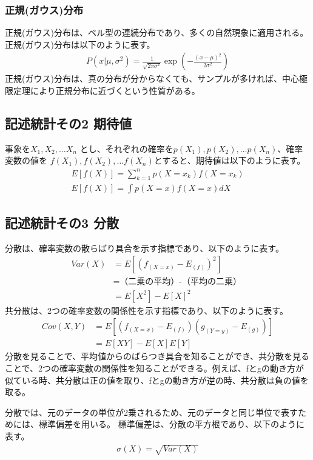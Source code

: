 \documentclass{ltjsarticle}
\begin{document}
\par
\subsubsection*{正規(ガウス)分布}
正規(ガウス)分布は、ベル型の連続分布であり、多くの自然現象に適用される。
正規(ガウス)分布は以下のように表す。
\begin{align}
P(x|\mu, \sigma^2) = \frac{1}{\sqrt{2\pi\sigma^2}} \exp \left( -\frac{(x-\mu)^2}{2\sigma^2} \right)
\end{align}
正規(ガウス)分布は、真の分布が分からなくても、サンプルが多ければ、中心極限定理により正規分布に近づくという性質がある。

\par 

\subsection{記述統計その2 期待値}
事象を$X_1, X_2, \dots X_n$ とし、それぞれの確率を$p(X_1), p(X_2), \dots p(X_n)$、確率変数の値を $f(X_1), f(X_2), \dots f(X_n)$とすると、期待値は以下のように表す。
\begin{align}
E[f(X)] = \sum_{k=1}^{n} p(X=x_k) f(X=x_k) \\
E[f(X)] = \int p(X=x) f(X=x) dX
\end{align}

\newpage

\subsection{記述統計その3 分散}
分散は、確率変数の散らばり具合を示す指標であり、以下のように表す。
\begin{align}
Var(X) &= E[(f_{(X=x)} - E_{(f)})^2]\\
&= \text{（二乗の平均）-（平均の二乗） }\\
&= E[X^2] - E[X]^2 
\end{align}
共分散は、2つの確率変数の関係性を示す指標であり、以下のように表す。
\begin{align}
Cov(X, Y) &= E[(f_{(X=x)} - E_{(f)})(g_{(Y=y)} - E_{(g)})]\\
&= E[XY] - E[X]E[Y]
\end{align}
分散を見ることで、平均値からのばらつき具合を知ることができ、共分散を見ることで、2つの確率変数の関係性を知ることができる。例えば、fとgの動き方が似ている時、共分散は正の値を取り、fとgの動き方が逆の時、共分散は負の値を取る。
\par
分散では、元のデータの単位が2乗されるため、元のデータと同じ単位で表すためには、標準偏差を用いる。
標準偏差は、分散の平方根であり、以下のように表す。
\begin{align}
 \sigma(X) = \sqrt{Var(X)}
\end{align}
\end{document}
